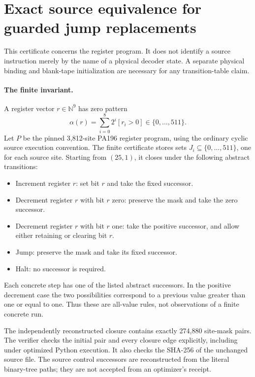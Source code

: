 \section{Exact source equivalence for guarded jump replacements}
\label{sec:zero-jump-source}

This certificate concerns the register program. It does not identify a
source instruction merely by the name of a physical decoder state.
A separate physical binding and blank-tape initialization are necessary
for any transition-table claim.

\paragraph{The finite invariant.}
A register vector $r\in\mathbb N^9$ has zero pattern
\[
 \alpha(r)=\sum_{i=0}^{8}2^i[r_i>0]\in\{0,\ldots,511\}.
\]
Let $P$ be the pinned 3,812-site PA196 register program, using the ordinary
cyclic source execution convention. The finite certificate stores sets
$J_i\subseteq\{0,\ldots,511\}$, one for each source site. Starting from
$(25,1)$, it closes under the following abstract transitions:
\begin{itemize}
\item Increment register $r$: set bit $r$ and take the fixed successor.
\item Decrement register $r$ with bit $r$ zero: preserve the mask and take
      the zero successor.
\item Decrement register $r$ with bit $r$ one: take the positive successor,
      and allow either retaining or clearing bit $r$.
\item Jump: preserve the mask and take its fixed successor.
\item Halt: no successor is required.
\end{itemize}
Each concrete step has one of the listed abstract successors. In the
positive decrement case the two possibilities correspond to a previous
value greater than one or equal to one. Thus these are all-value rules,
not observations of a finite concrete run.

The independently reconstructed closure contains exactly 274,880
site-mask pairs. The verifier checks the initial pair and every closure
edge explicitly, including under optimized Python execution. It also
checks the SHA-256 of the unchanged source file. The source control
successors are reconstructed from the literal binary-tree paths; they
are not accepted from an optimizer's receipt.

